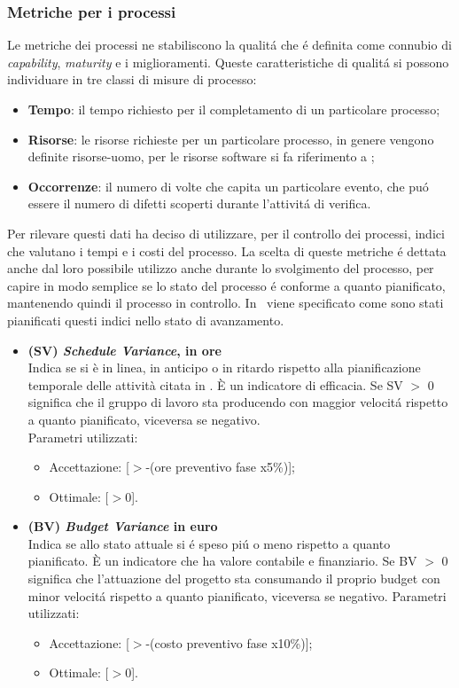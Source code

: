 \subsubsection{Metriche per i processi}
Le metriche dei processi ne stabiliscono la qualit\'a che \'e definita come connubio di \textit{capability}, \textit{maturity} e i miglioramenti. Queste caratteristiche di qualit\'a si possono individuare in tre classi di misure di processo:
\begin{itemize}
\item \textbf{Tempo}: il tempo richiesto per il completamento di un particolare processo;
\item \textbf{Risorse}: le risorse richieste per un particolare processo, in genere vengono definite risorse-uomo, per le risorse software si fa riferimento a \infoNDP;
\item \textbf{Occorrenze}: il numero di volte che capita un particolare evento, che pu\'o essere il numero di difetti scoperti durante l'attivit\'a di verifica.
\end{itemize}
Per rilevare questi dati \gruppo{} ha deciso di utilizzare, per il controllo dei processi, indici che valutano i tempi e i costi del processo. La scelta di queste metriche \'e dettata anche dal loro possibile utilizzo anche durante lo svolgimento del processo, per capire in modo semplice se lo stato del processo \'e conforme a quanto pianificato, mantenendo quindi il processo in controllo. In \infoPDP ~viene specificato come sono stati pianificati questi indici nello stato di avanzamento.
\begin{itemize}
\item \textbf{(SV) \textit{Schedule Variance}, in ore}\\
Indica se si è in linea, in anticipo o in ritardo rispetto alla pianificazione temporale delle
attività citata in \infoPDP.
È un indicatore di efficacia.
Se SV $>$ 0 significa che il gruppo di lavoro sta producendo con maggior velocit\'a rispetto a quanto pianificato, viceversa se negativo.\\
Parametri utilizzati:
\begin{itemize}
\item Accettazione: [$>$-(ore preventivo fase x5\%)];
\item Ottimale: [$>$0].
\end{itemize}

\item \textbf{(BV) \textit{Budget Variance} in euro}\\
Indica se allo stato attuale si \'e speso pi\'u o meno rispetto a quanto pianificato.
È un indicatore che ha valore contabile e finanziario.
Se BV $>$ 0 significa che l’attuazione del progetto sta consumando il proprio budget con minor velocit\'a rispetto a quanto pianificato, viceversa se negativo.
Parametri utilizzati:\\
\begin{itemize}
\item Accettazione: [$>$-(costo preventivo fase x10\%)];
\item Ottimale: [$>$0].
\end{itemize}
\end{itemize}

